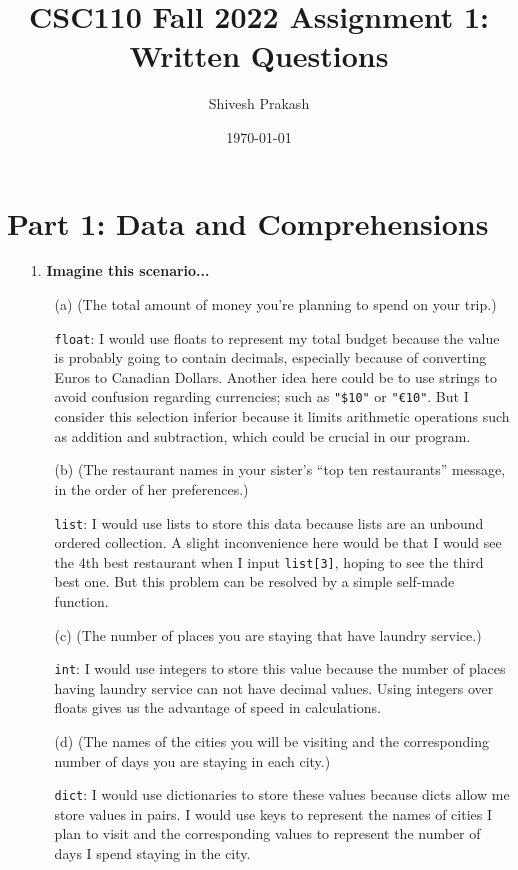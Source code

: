 \documentclass[12pt]{article}
\title{CSC110 Fall 2022 Assignment 1: Written Questions}
\author{Shivesh Prakash}
\date{\today}
\begin{document}
\maketitle

\section*{Part 1: Data and Comprehensions}

\begin{enumerate}
\item[1.] \textbf{Imagine this scenario...}
\begin{enumerate}
\item[(a)] (The total amount of money you're planning to spend on your trip.)

\texttt{float}: I would use floats to represent my total budget because the value is probably going to contain decimals, especially because of converting Euros to Canadian Dollars. Another idea here could be to use strings to avoid confusion regarding currencies; such as \texttt{"\$10"} or \texttt{"€10"}. But I consider this selection inferior because it limits arithmetic operations such as addition and subtraction, which could be crucial in our program.

\item[(b)] (The restaurant names in your sister's ``top ten restaurants'' message, in the order of her preferences.)

\texttt{list}: I would use lists to store this data because lists are an unbound ordered collection. A slight inconvenience here would be that I would see the 4th best restaurant when I input \texttt{list[3]}, hoping to see the third best one. But this problem can be resolved by a simple self-made function. 

\item[(c)] (The number of places you are staying that have laundry service.)

\texttt{int}: I would use integers to store this value because the number of places having laundry service can not have decimal values. Using integers over floats gives us the advantage of speed in calculations. 

\item[(d)] (The names of the cities you will be visiting and the corresponding number of days you are staying in each city.)

\texttt{dict}: I would use dictionaries to store these values because dicts allow me store values in pairs. I would use keys to represent the names of cities I plan to visit and the corresponding values to represent the number of days I spend staying in the city. 


\end{enumerate}
\end{enumerate}
\end{document}
